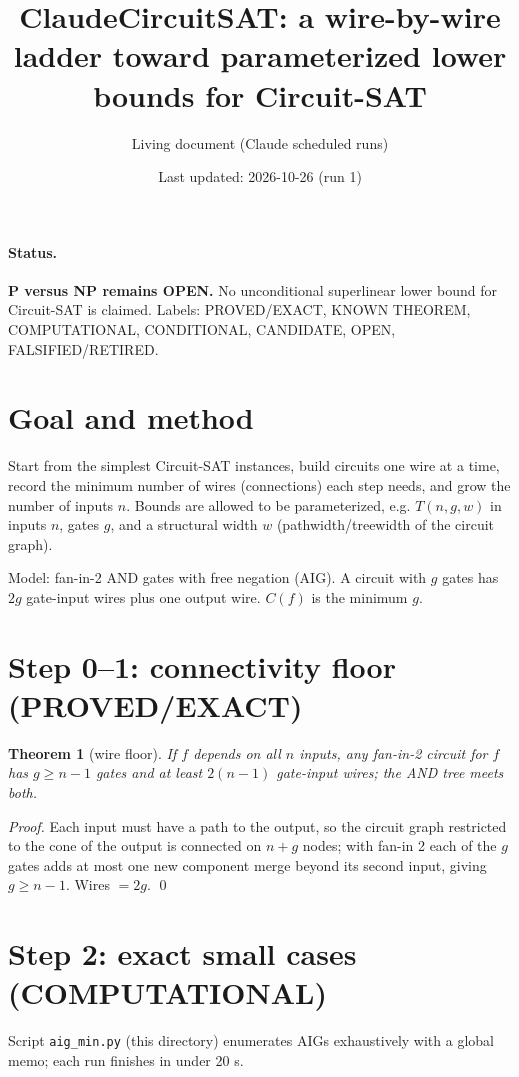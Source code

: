 \documentclass[11pt]{article}
\title{ClaudeCircuitSAT: a wire-by-wire ladder toward parameterized lower bounds for Circuit-SAT}
\author{Living document (Claude scheduled runs)}
\date{Last updated: 2026-10-26 (run 1)}
\newtheorem{thm}{Theorem}\newtheorem{lem}[thm]{Lemma}
\begin{document}
\maketitle
\paragraph{Status.} \textbf{P versus NP remains OPEN.} No unconditional superlinear
lower bound for Circuit-SAT is claimed. Labels: PROVED/EXACT, KNOWN THEOREM,
COMPUTATIONAL, CONDITIONAL, CANDIDATE, OPEN, FALSIFIED/RETIRED.

\section{Goal and method}
Start from the simplest Circuit-SAT instances, build circuits one wire at a time, record
the minimum number of wires (connections) each step needs, and grow the number of inputs
$n$. Bounds are allowed to be parameterized, e.g. $T(n,g,w)$ in inputs $n$, gates $g$, and a
structural width $w$ (pathwidth/treewidth of the circuit graph).

Model: fan-in-2 AND gates with free negation (AIG). A circuit with $g$ gates has $2g$ gate-input
wires plus one output wire. $C(f)$ is the minimum $g$.

\section{Step 0--1: connectivity floor (PROVED/EXACT)}
\begin{thm}[wire floor]\label{thm:floor}
If $f$ depends on all $n$ inputs, any fan-in-2 circuit for $f$ has $g\ge n-1$ gates and at
least $2(n-1)$ gate-input wires; the AND tree meets both.
\end{thm}
\begin{proof} Each input must have a path to the output, so the circuit graph restricted to
the cone of the output is connected on $n+g$ nodes; with fan-in 2 each of the $g$ gates adds
at most one new component merge beyond its second input, giving $g\ge n-1$. Wires $=2g$. \qed
\end{proof}

\section{Step 2: exact small cases (COMPUTATIONAL)}
Script \texttt{aig\_min.py} (this directory) enumerates AIGs exhaustively with a global
memo; each run finishes in under 20 s.
\end{document}
